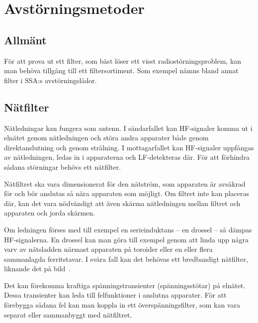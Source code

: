 \section{Avstörningsmetoder}
\label{sec:avstoerning}


\subsection{Allmänt}
För att prova ut ett filter, som bäst löser ett visst radiostörningsproblem,
kan man behöva tillgång till ett filtersortiment.
Som exempel nämns bland annat filter i SSA:s avstörningslådor.

\subsection{Nätfilter}

Nätledningar kan fungera som antenn.
I sändarfallet kan HF-signaler komma ut i elnätet genom nätledningen och störa
andra apparater både genom direktanslutning och genom strålning.
I mottagarfallet kan HF-signaler uppfångas av nätledningen, ledas in i
apparaterna och LF-detekteras där.
För att förhindra sådana störningar behövs ett nätfilter.

Nätfiltret ska vara dimensionerat för den nätström, som apparaten är avsäkrad
för och bör anslutas så nära apparaten som möjligt.
Om filtret inte kan placeras där, kan det vara nödvändigt att även skärma
nätledningen mellan filtret och apparaten och jorda skärmen.


Om ledningen förses med till exempel en serieinduktans -- en drossel -- så
dämpas HF-signalerna.
En drossel kan man göra till exempel genom att linda upp några varv av nätsladden
närmast apparaten på toroider eller en eller flera sammanlagda ferritstavar.
I svåra fall kan det behövas ett bredbandigt nätfilter, liknande
det på bild~.

Det kan förekomma kraftiga spänningstransienter (spänningsstötar) på elnätet.
Dessa transienter kan leda till felfunktioner i anslutna apparater.
För att förebygga sådana fel kan man koppla in ett överspänningsfilter, som kan
vara separat eller sammanbyggt med nätfiltret.

